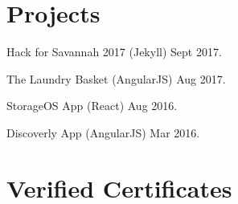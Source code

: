 \documentclass[letterpaper]{article}
\renewenvironment{itemize}{
  \begin{list}{}{
    \setlength{\leftmargin}{1.5em}
  }
}{
  \end{list}
}
\begin{document}
\section*{Projects}

\begin{itemize}

\item Hack for Savannah 2017 (Jekyll) Sept 2017.
\item The Laundry Basket (AngularJS) Aug 2017.
\item StorageOS App (React) Aug 2016.
\item Discoverly App (AngularJS) Mar 2016.

\end{itemize}



\section*{Verified Certificates}
\end{document}
